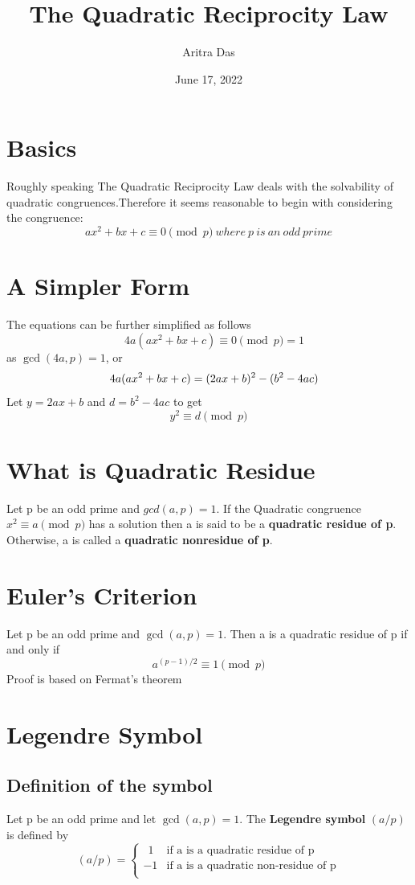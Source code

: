 \documentclass[20pt,a4paper]{article}
\author{Aritra Das}
\title{The Quadratic Reciprocity Law}
\date{June 17, 2022}
\begin{document}
\maketitle

\section{Basics}
Roughly speaking The Quadratic Reciprocity Law deals with the solvability of quadratic congruences.Therefore it seems reasonable to begin with considering the congruence:
\begin{equation}
    ax^2 + bx + c \equiv 0 \pmod{p} \ where \ p\ is \ an \ odd \ prime
\end{equation}
\section{A Simpler Form}
The equations can be further simplified as follows \\
\[
\quad 4a(ax^2 + bx + c) \equiv 0 \pmod{p}  = 1
\]
as $\gcd(4a,p) = 1$,
or \\
\[
\quad 4a(ax^2 + bx + c) = (2ax+b)^2 - (b^2 - 4ac) \\
\]
Let $y = 2ax + b$ and $d = b^2 - 4ac$ to get
\begin{equation}
    y^2 \equiv d \pmod{p}
\end{equation}
\section{What is Quadratic Residue}
Let p be an odd prime and $gcd(a,p)=1$. If the Quadratic congruence $x^2 \equiv a \pmod{p}$ has a solution then a is said to be a \textbf{quadratic residue of p}. Otherwise,  a is called a \textbf{quadratic nonresidue of p}.
\section{Euler's Criterion}
    Let p be an odd prime and $\gcd(a,p)=1$. Then a is a quadratic residue of p if and only if 
\begin{equation}
   a^{(p-1)/2} \equiv 1 \pmod{p} 
\end{equation}
Proof is based on Fermat's theorem
\section{Legendre Symbol}    
\subsection{Definition of the symbol}
Let p be an odd prime and let $\gcd(a,p)=1$. The \textbf{Legendre symbol} $(a/p)$ is defined by
\[
(a/p) =
\left\{
\begin{array}{ll}
    \ \ 1 & \text{if a is a quadratic residue of p }  \\
   -1 & \text{if a is a quadratic non-residue of p} \\
\end{array}
\right.
\]
\end{document}
